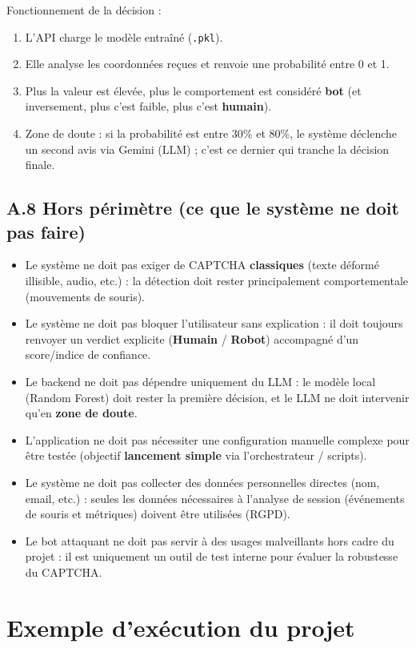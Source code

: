 \documentclass[a4paper, 12pt, twoside]{article}
\begin{document}
Fonctionnement de la décision :
\begin{enumerate}
    \item L'API charge le modèle entraîné (\texttt{.pkl}).
    \item Elle analyse les coordonnées reçues et renvoie une probabilité entre 0 et 1.
    \item Plus la valeur est élevée, plus le comportement est considéré \textbf{bot} (et inversement, plus c'est faible, plus c'est \textbf{humain}).
    \item Zone de doute : si la probabilité est entre 30\% et 80\%, le système déclenche un second avis via Gemini (LLM) ; c'est ce dernier qui tranche la décision finale.
\end{enumerate}

\subsection*{A.8 Hors périmètre (ce que le système ne doit pas faire)}
\begin{itemize}
    \item Le système ne doit pas exiger de CAPTCHA \textbf{classiques} (texte déformé illisible, audio, etc.) : la détection doit rester principalement comportementale (mouvements de souris).
    \item Le système ne doit pas bloquer l'utilisateur sans explication : il doit toujours renvoyer un verdict explicite (\textbf{Humain} / \textbf{Robot}) accompagné d'un score/indice de confiance.
    \item Le backend ne doit pas dépendre uniquement du LLM : le modèle local (Random Forest) doit rester la première décision, et le LLM ne doit intervenir qu'en \textbf{zone de doute}.
    \item L'application ne doit pas nécessiter une configuration manuelle complexe pour être testée (objectif \textbf{lancement simple} via l'orchestrateur / scripts).
    \item Le système ne doit pas collecter des données personnelles directes (nom, email, etc.) : seules les données nécessaires à l'analyse de session (événements de souris et métriques) doivent être utilisées (RGPD).
    \item Le bot attaquant ne doit pas servir à des usages malveillants hors cadre du projet : il est uniquement un outil de test interne pour évaluer la robustesse du CAPTCHA.
\end{itemize}

\section{Exemple d'exécution du projet}
\end{document}
